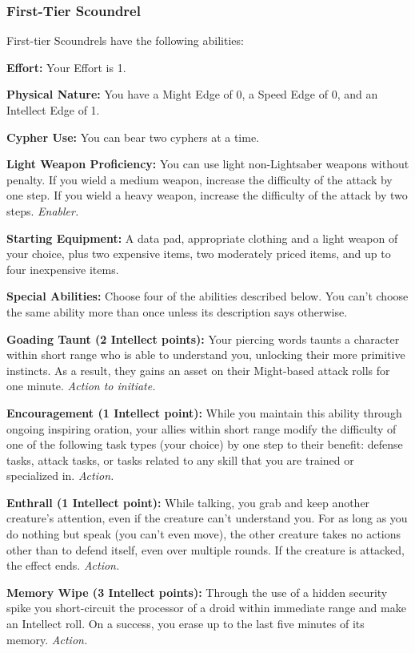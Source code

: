 \documentclass[a4paper,10pt,final,twocolumn,oneside]{book}
\newcommand{\itemLine}[2]{\textbf{#1:}{ #2}\par}
\newcommand{\itemAbility}[2]{\textcolor{25gray}{\textbullet\textbf{ #1:}}{ #2}\par}
\newcommand{\enabler}{\textit{ Enabler.}}
\newcommand{\action}{\textit{ Action.}}
\newcommand{\actionInit}{\textit{ Action to initiate.}}
\begin{document}
\subsubsection*{First-Tier Scoundrel}
\label{subsub:scoundrelFirstTier}

First-tier Scoundrels have the following abilities:

\itemLine{Effort}{Your Effort is 1.}

\itemLine{Physical Nature}{You have a Might Edge of 0, a Speed Edge of 0, and an Intellect Edge of 1.}

\itemLine{Cypher Use}{You can bear two cyphers at a time.}

\itemLine{Light Weapon Proficiency}{You can use light non-Lightsaber weapons without penalty. If you wield a medium weapon, increase the difficulty of the attack by one step. If you wield a heavy weapon, increase the difficulty of the attack by two steps.\enabler}

\itemLine{Starting Equipment}{A data pad, appropriate clothing and a light weapon of your choice, plus two expensive items, two moderately priced items, and up to four inexpensive items.}

\itemLine{Special Abilities}{Choose four of the abilities described below. You can’t choose the same ability more than once unless its description says otherwise.}

\itemAbility{Goading Taunt (2 Intellect points)}{Your piercing words taunts a character within short range who is able to understand you, unlocking their more primitive instincts. As a result, they gains an asset on their Might-based attack rolls for one minute.\actionInit}

\itemAbility{Encouragement (1 Intellect point)}{While you maintain this ability through ongoing inspiring oration, your allies within short range modify the difficulty of one of the following task types (your choice) by one step to their benefit: defense tasks, attack tasks, or tasks related to any skill that you are trained or specialized in.\action}

\itemAbility{Enthrall (1 Intellect point)}{While talking, you grab and keep another creature’s attention, even if the creature can’t understand you. For as long as you do nothing but speak (you can’t even move), the other creature takes no actions other than to defend itself, even over multiple rounds. If the creature is attacked, the effect ends.\action}

\itemAbility{Memory Wipe (3 Intellect points)}{Through the use of a hidden security spike you short-circuit the processor of a droid within immediate range and make an Intellect roll. On a success, you erase up to the last five minutes of its memory.\action}
\end{document}
